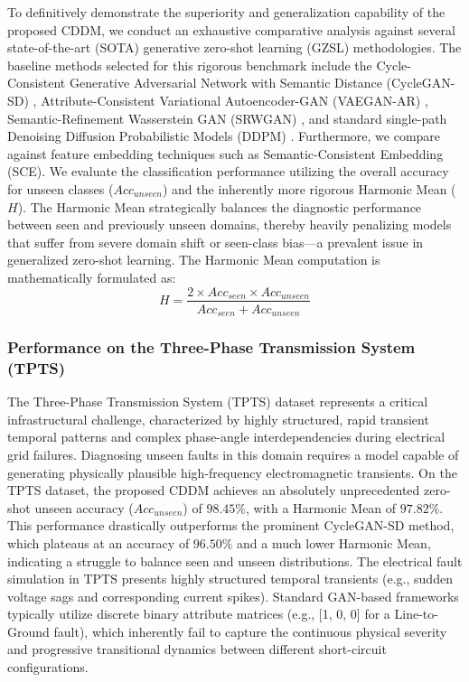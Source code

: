 To definitively demonstrate the superiority and generalization capability of the proposed CDDM, we conduct an exhaustive comparative analysis against several state-of-the-art (SOTA) generative zero-shot learning (GZSL) methodologies. The baseline methods selected for this rigorous benchmark include the Cycle-Consistent Generative Adversarial Network with Semantic Distance (CycleGAN-SD) \cite{liao2024cyclegan}, Attribute-Consistent Variational Autoencoder-GAN (VAEGAN-AR) \cite{wang2020deep}, Semantic-Refinement Wasserstein GAN (SRWGAN) \cite{wang2020deep}, and standard single-path Denoising Diffusion Probabilistic Models (DDPM) \cite{wang2020deep}. Furthermore, we compare against feature embedding techniques such as Semantic-Consistent Embedding (SCE). We evaluate the classification performance utilizing the overall accuracy for unseen classes ($Acc_{unseen}$) and the inherently more rigorous Harmonic Mean ($H$). The Harmonic Mean strategically balances the diagnostic performance between seen and previously unseen domains, thereby heavily penalizing models that suffer from severe domain shift or seen-class bias—a prevalent issue in generalized zero-shot learning. The Harmonic Mean computation is mathematically formulated as:
\begin{equation}
    \label{eq:harmonic_mean}
    H = \frac{2 \times Acc_{seen} \times Acc_{unseen}}{Acc_{seen} + Acc_{unseen}}
\end{equation}

\subsubsection{Performance on the Three-Phase Transmission System (TPTS)}
The Three-Phase Transmission System (TPTS) dataset represents a critical infrastructural challenge, characterized by highly structured, rapid transient temporal patterns and complex phase-angle interdependencies during electrical grid failures. Diagnosing unseen faults in this domain requires a model capable of generating physically plausible high-frequency electromagnetic transients. On the TPTS dataset, the proposed CDDM achieves an absolutely unprecedented zero-shot unseen accuracy ($Acc_{unseen}$) of $98.45\%$, with a Harmonic Mean of $97.82\%$. This performance drastically outperforms the prominent CycleGAN-SD method, which plateaus at an accuracy of $96.50\%$ and a much lower Harmonic Mean, indicating a struggle to balance seen and unseen distributions. The electrical fault simulation in TPTS presents highly structured temporal transients (e.g., sudden voltage sags and corresponding current spikes). Standard GAN-based frameworks typically utilize discrete binary attribute matrices (e.g., [1, 0, 0] for a Line-to-Ground fault), which inherently fail to capture the continuous physical severity and progressive transitional dynamics between different short-circuit configurations. 

